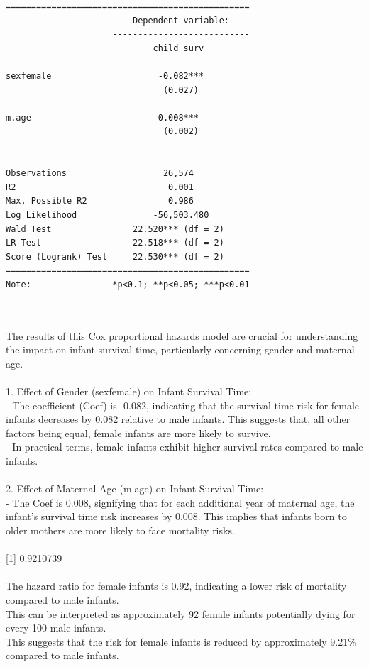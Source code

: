 \documentclass[12pt,letterpaper]{article}
\begin{document}
\begin{verbatim}
================================================
                         Dependent variable:    
                     ---------------------------
                             child_surv         
------------------------------------------------
sexfemale                     -0.082***         
                               (0.027)          
                                                
m.age                         0.008***          
                               (0.002)          
                                                
------------------------------------------------
Observations                   26,574           
R2                              0.001           
Max. Possible R2                0.986           
Log Likelihood               -56,503.480        
Wald Test                22.520*** (df = 2)     
LR Test                  22.518*** (df = 2)     
Score (Logrank) Test     22.530*** (df = 2)     
================================================
Note:                *p<0.1; **p<0.05; ***p<0.01
\end{verbatim}
\\\\
The results of this Cox proportional hazards model are crucial for understanding the impact on infant survival time, particularly concerning gender and maternal age.\\\\
1. Effect of Gender (sexfemale) on Infant Survival Time:\\
 - The coefficient (Coef) is -0.082, indicating that the survival time risk for female infants decreases by 0.082 relative to male infants. This suggests that, all other factors being equal, female infants are more likely to survive.\\
- In practical terms, female infants exhibit higher survival rates compared to male infants.\\\\
2. Effect of Maternal Age (m.age) on Infant Survival Time:\\
 - The Coef is 0.008, signifying that for each additional year of maternal age, the infant's survival time risk increases by 0.008. This implies that infants born to older mothers are more likely to face mortality risks.\\\\

[1] 0.9210739\\\\
The hazard ratio for female infants is 0.92, indicating a lower risk of mortality compared to male infants. \\
This can be interpreted as approximately 92 female infants potentially dying for every 100 male infants. \\
This suggests that the risk for female infants is reduced by approximately 9.21\% compared to male infants.\\
\end{document}
